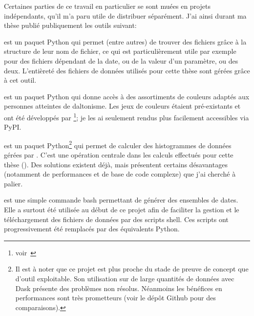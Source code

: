 \bigskip

Certaines parties de ce travail en particulier se sont muées en projets indépendants, qu'il m'a paru utile de distribuer séparément.
J'ai ainsi durant ma thèse publié publiquement les outils suivant:
\begin{description}
  \setlength{\itemsep}{2\baselineskip}
  \item[FileFinder]
        est un paquet Python qui permet (entre autres) de trouver des fichiers grâce à la structure de leur nom de fichier, ce qui est particulièrement utile par exemple pour des fichiers dépendant de la date, ou de la valeur d'un paramètre, ou des deux.
        L'entièreté des fichiers de données utilisés pour cette thèse sont gérées grâce à cet outil.

  \item[tol-colors]
        est un paquet Python qui donne accès à des assortiments de couleurs adaptés aux personnes atteintes de daltonisme.
        Les jeux de couleurs étaient pré-existants et ont été développés par \footnote{voir~}; je les ai seulement rendus plus facilement accessibles via PyPI.

  \item[Xarray-histogram]
        est un paquet Python\footnote{%
        Il est à noter que ce projet est plus proche du stade de preuve de concept que d'outil exploitable.
        Son utilisation sur de large quantités de données avec Dask présente des problèmes non résolus.
        Néanmoins les bénéfices en performances sont très prometteurs (voir le dépôt Github pour des comparaisons).
        } qui permet de calculer des histogrammes de données gérées par .
        C'est une opération centrale dans les calculs effectués pour cette thèse ().
        Des solutions existent déjà, mais présentent certains désavantages (notamment de performances et de base de code complexe) que j'ai cherché à palier.

  \item[dateloop]
        est une simple commande bash permettant de générer des ensembles de dates.
        Elle a surtout été utilisée au début de ce projet afin de faciliter la gestion et le téléchargement des fichiers de données par des scripts shell. Ces scripts ont progressivement été remplacés par des équivalents Python.

\end{description}

